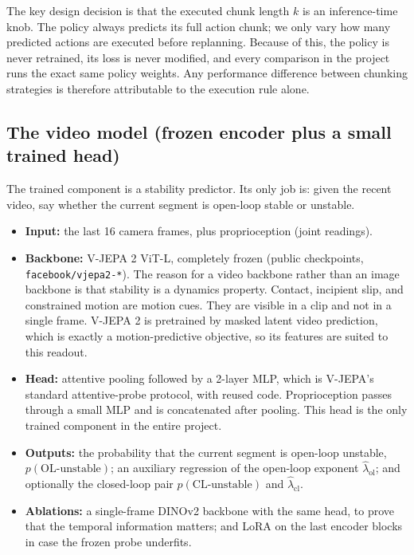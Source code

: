 \documentclass[11pt]{article}
\begin{document}
The key design decision is that the executed chunk length $k$ is an inference-time knob.
The policy always predicts its full action chunk; we only vary how many predicted actions
are executed before replanning. Because of this, the policy is never retrained, its loss
is never modified, and every comparison in the project runs the exact same policy
weights. Any performance difference between chunking strategies is therefore attributable
to the execution rule alone.

\subsection{The video model (frozen encoder plus a small trained head)}

The trained component is a stability predictor. Its only job is: given the recent video,
say whether the current segment is open-loop stable or unstable.

\begin{itemize}[leftmargin=2em]
  \item \textbf{Input:} the last 16 camera frames, plus proprioception (joint readings).
  \item \textbf{Backbone:} V-JEPA 2 ViT-L, completely frozen (public checkpoints,
        \texttt{facebook/vjepa2-*}). The reason for a video backbone rather than an
        image backbone is that stability is a dynamics property. Contact, incipient
        slip, and constrained motion are motion cues. They are visible in a clip and not
        in a single frame. V-JEPA 2 is pretrained by masked latent video prediction,
        which is exactly a motion-predictive objective, so its features are suited to
        this readout.
  \item \textbf{Head:} attentive pooling followed by a 2-layer MLP, which is V-JEPA's
        standard attentive-probe protocol, with reused code. Proprioception passes
        through a small MLP and is concatenated after pooling. This head is the only
        trained component in the entire project.
  \item \textbf{Outputs:} the probability that the current segment is open-loop
        unstable, $p(\text{OL-unstable})$; an auxiliary regression of the open-loop
        exponent $\hat\lambda_{\mathrm{ol}}$; and optionally the closed-loop pair
        $p(\text{CL-unstable})$ and $\hat\lambda_{\mathrm{cl}}$.
  \item \textbf{Ablations:} a single-frame DINOv2 backbone with the same head, to prove
        that the temporal information matters; and LoRA on the last encoder blocks in
        case the frozen probe underfits.
\end{itemize}
\end{document}
